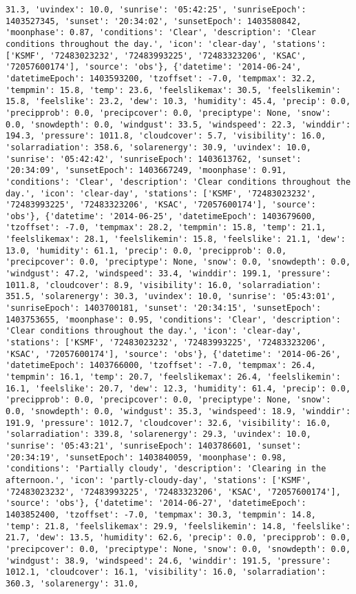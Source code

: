 \documentclass[
  letterpaper,
  DIV=11,
  numbers=noendperiod]{scrartcl}
\begin{document}
\begin{verbatim}
31.3, 'uvindex': 10.0, 'sunrise': '05:42:25', 'sunriseEpoch': 1403527345, 'sunset': '20:34:02', 'sunsetEpoch': 1403580842, 'moonphase': 0.87, 'conditions': 'Clear', 'description': 'Clear conditions throughout the day.', 'icon': 'clear-day', 'stations': ['KSMF', '72483023232', '72483993225', '72483323206', 'KSAC', '72057600174'], 'source': 'obs'}, {'datetime': '2014-06-24', 'datetimeEpoch': 1403593200, 'tzoffset': -7.0, 'tempmax': 32.2, 'tempmin': 15.8, 'temp': 23.6, 'feelslikemax': 30.5, 'feelslikemin': 15.8, 'feelslike': 23.2, 'dew': 10.3, 'humidity': 45.4, 'precip': 0.0, 'precipprob': 0.0, 'precipcover': 0.0, 'preciptype': None, 'snow': 0.0, 'snowdepth': 0.0, 'windgust': 33.5, 'windspeed': 22.3, 'winddir': 194.3, 'pressure': 1011.8, 'cloudcover': 5.7, 'visibility': 16.0, 'solarradiation': 358.6, 'solarenergy': 30.9, 'uvindex': 10.0, 'sunrise': '05:42:42', 'sunriseEpoch': 1403613762, 'sunset': '20:34:09', 'sunsetEpoch': 1403667249, 'moonphase': 0.91, 'conditions': 'Clear', 'description': 'Clear conditions throughout the day.', 'icon': 'clear-day', 'stations': ['KSMF', '72483023232', '72483993225', '72483323206', 'KSAC', '72057600174'], 'source': 'obs'}, {'datetime': '2014-06-25', 'datetimeEpoch': 1403679600, 'tzoffset': -7.0, 'tempmax': 28.2, 'tempmin': 15.8, 'temp': 21.1, 'feelslikemax': 28.1, 'feelslikemin': 15.8, 'feelslike': 21.1, 'dew': 13.0, 'humidity': 61.1, 'precip': 0.0, 'precipprob': 0.0, 'precipcover': 0.0, 'preciptype': None, 'snow': 0.0, 'snowdepth': 0.0, 'windgust': 47.2, 'windspeed': 33.4, 'winddir': 199.1, 'pressure': 1011.8, 'cloudcover': 8.9, 'visibility': 16.0, 'solarradiation': 351.5, 'solarenergy': 30.3, 'uvindex': 10.0, 'sunrise': '05:43:01', 'sunriseEpoch': 1403700181, 'sunset': '20:34:15', 'sunsetEpoch': 1403753655, 'moonphase': 0.95, 'conditions': 'Clear', 'description': 'Clear conditions throughout the day.', 'icon': 'clear-day', 'stations': ['KSMF', '72483023232', '72483993225', '72483323206', 'KSAC', '72057600174'], 'source': 'obs'}, {'datetime': '2014-06-26', 'datetimeEpoch': 1403766000, 'tzoffset': -7.0, 'tempmax': 26.4, 'tempmin': 16.1, 'temp': 20.7, 'feelslikemax': 26.4, 'feelslikemin': 16.1, 'feelslike': 20.7, 'dew': 12.3, 'humidity': 61.4, 'precip': 0.0, 'precipprob': 0.0, 'precipcover': 0.0, 'preciptype': None, 'snow': 0.0, 'snowdepth': 0.0, 'windgust': 35.3, 'windspeed': 18.9, 'winddir': 191.9, 'pressure': 1012.7, 'cloudcover': 32.6, 'visibility': 16.0, 'solarradiation': 339.8, 'solarenergy': 29.3, 'uvindex': 10.0, 'sunrise': '05:43:21', 'sunriseEpoch': 1403786601, 'sunset': '20:34:19', 'sunsetEpoch': 1403840059, 'moonphase': 0.98, 'conditions': 'Partially cloudy', 'description': 'Clearing in the afternoon.', 'icon': 'partly-cloudy-day', 'stations': ['KSMF', '72483023232', '72483993225', '72483323206', 'KSAC', '72057600174'], 'source': 'obs'}, {'datetime': '2014-06-27', 'datetimeEpoch': 1403852400, 'tzoffset': -7.0, 'tempmax': 30.3, 'tempmin': 14.8, 'temp': 21.8, 'feelslikemax': 29.9, 'feelslikemin': 14.8, 'feelslike': 21.7, 'dew': 13.5, 'humidity': 62.6, 'precip': 0.0, 'precipprob': 0.0, 'precipcover': 0.0, 'preciptype': None, 'snow': 0.0, 'snowdepth': 0.0, 'windgust': 38.9, 'windspeed': 24.6, 'winddir': 191.5, 'pressure': 1012.1, 'cloudcover': 16.1, 'visibility': 16.0, 'solarradiation': 360.3, 'solarenergy': 31.0, 
\end{verbatim}
\end{document}
